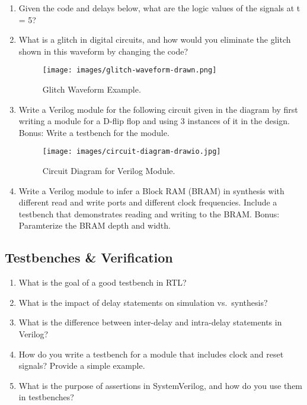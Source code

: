 \documentclass[11pt]{article}
\begin{document}
\begin{enumerate}
    \item Given the code and delays below, what are the logic
    values of the signals at t = 5?
    



    \item What is a glitch in digital circuits, and how would you eliminate the
    glitch shown in this waveform by changing the code?
    
    

    \begin{figure}[H]
        \centering
        \texttt{[image: images/glitch-waveform-drawn.png]}
        \caption{Glitch Waveform Example.}
        \label{fig:glitch_waveform}
    \end{figure}

    \item Write a Verilog module for the following circuit given in the diagram
    by first writing a module for a D-flip flop and using 3 instances of it in
    the design. Bonus: Write a testbench for the module.
    \begin{figure}[H]
        \centering
        \texttt{[image: images/circuit-diagram-drawio.jpg]}
        \caption{Circuit Diagram for Verilog Module.}
        \label{fig:verilog_circuit}
    \end{figure}

    \item Write a Verilog module to infer a Block RAM (BRAM) in synthesis with different read and write
    ports and different clock frequencies. Include a testbench that demonstrates reading and writing to the BRAM.
    Bonus: Paramterize the BRAM depth and width.
\end{enumerate}

\subsection{Testbenches \& Verification}
\begin{enumerate}
    \item What is the goal of a good testbench in RTL?
    \item What is the impact of delay statements on simulation vs.\ synthesis?
    \item What is the difference between inter-delay and intra-delay
    statements in Verilog?
    \item How do you write a testbench for a module that includes clock and
    reset signals? Provide a simple example.
    \item What is the purpose of assertions in SystemVerilog, and how do you
    use them in testbenches?
\end{enumerate}
\end{document}
